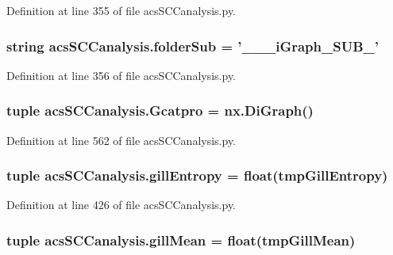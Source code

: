 Definition at line 355 of file acs\-S\-C\-Canalysis.\-py.

\hypertarget{a00128_a90c2bcabbdb271c2c3347ebea4c259bc}{
\subsubsection[{folder\-Sub}]{\setlength{\rightskip}{0pt plus 5cm}string acs\-S\-C\-Canalysis.\-folder\-Sub = '\-\_\-\-\_\-\_\-i\-Graph\-\_\-\-S\-U\-B\-\_\-'}}\label{a00128_a90c2bcabbdb271c2c3347ebea4c259bc}


Definition at line 356 of file acs\-S\-C\-Canalysis.\-py.

\hypertarget{a00128_ad88c3dd8eb89ddbe8720462b03f35003}{
\subsubsection[{Gcatpro}]{\setlength{\rightskip}{0pt plus 5cm}tuple acs\-S\-C\-Canalysis.\-Gcatpro = nx.\-Di\-Graph()}}\label{a00128_ad88c3dd8eb89ddbe8720462b03f35003}


Definition at line 562 of file acs\-S\-C\-Canalysis.\-py.

\hypertarget{a00128_a4c214eb4f6812d6182bae32715bce3ad}{
\subsubsection[{gill\-Entropy}]{\setlength{\rightskip}{0pt plus 5cm}tuple acs\-S\-C\-Canalysis.\-gill\-Entropy = float(tmp\-Gill\-Entropy)}}\label{a00128_a4c214eb4f6812d6182bae32715bce3ad}


Definition at line 426 of file acs\-S\-C\-Canalysis.\-py.

\hypertarget{a00128_a4e862896701636d17752f14810ff687f}{
\subsubsection[{gill\-Mean}]{\setlength{\rightskip}{0pt plus 5cm}tuple acs\-S\-C\-Canalysis.\-gill\-Mean = float(tmp\-Gill\-Mean)}}\label{a00128_a4e862896701636d17752f14810ff687f}


